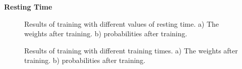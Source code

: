 \documentclass[10pt,a4paper]{article}
\begin{document}
\textbf{Resting Time}

\begin{figure}[H]
    \centering
    \qquad
    \caption{Results of training with different values of resting time. a) The weights after training. b) probabilities after training.}
    \label{fig:off_line_learning_resting}%
\end{figure}

\begin{figure}[H]
    \centering
    \qquad
    \caption{Results of training with different training times. a) The weights after training. b) probabilities after training.}
    \label{fig:off_line_learning_resting2}%
\end{figure}
\end{document}
